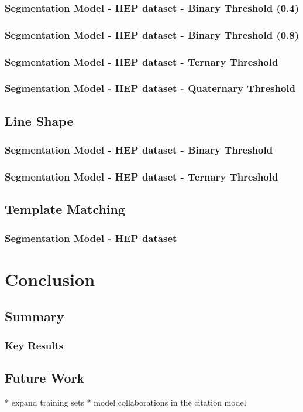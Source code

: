 \documentclass[10pt, oneside]{scrartcl}   	%
\begin{document}
\subsubsection{Segmentation Model - HEP dataset - Binary Threshold (0.4)}
\subsubsection{Segmentation Model - HEP dataset - Binary Threshold (0.8)}
\subsubsection{Segmentation Model - HEP dataset - Ternary Threshold}
\subsubsection{Segmentation Model - HEP dataset - Quaternary Threshold}
\subsection{Line Shape}
\subsubsection{Segmentation Model - HEP dataset - Binary Threshold}
\subsubsection{Segmentation Model - HEP dataset - Ternary Threshold}
\subsection{Template Matching}
\subsubsection{Segmentation Model - HEP dataset}
\section{Conclusion}
\subsection{Summary}
\subsubsection{Key Results}
\subsection{Future Work}
* expand training sets
* model collaborations in the citation model
\end{document}
